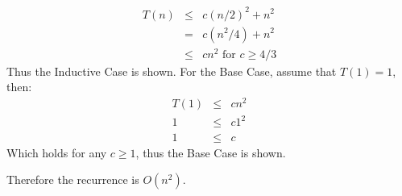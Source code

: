 \begin{eqnarray*}
	T(n) &\leq& c(n/2)^2 + n^2 \\
	 &=& c(n^2/4) + n^2 \\
	 &\leq& cn^2 \mbox{ for $c \geq 4/3$}
\end{eqnarray*}
Thus the Inductive Case is shown.  For the Base Case, assume that $T(1) = 1$, then:
\begin{eqnarray*}
	T(1) &\leq& cn^2 \\
	1 &\leq& c1^2 \\
	1 &\leq& c
\end{eqnarray*}
Which holds for any $c \geq 1$, thus the Base Case is shown.

Therefore the recurrence is $O(n^2)$.
